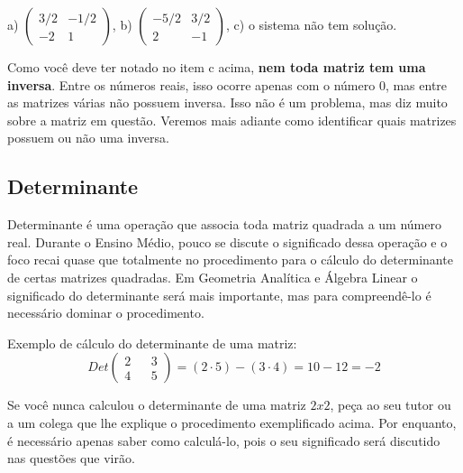 \documentclass[main.tex]{subfiles}
\begin{document}
\begin{gabarito}
	\begin{gabaritoQuestao}
		a) $\begin{pmatrix} 3/2 & -1/2 \\ -2 & 1\end{pmatrix}$, b) $\begin{pmatrix} -5/2 & 3/2 \\ 2 & -1\end{pmatrix}$, c) o sistema não tem solução.
	\end{gabaritoQuestao}
\end{gabarito}

Como você deve ter notado no item c acima, \textbf{nem toda matriz tem uma inversa}. Entre os números reais, isso ocorre apenas com o número 0, mas entre as matrizes várias não possuem inversa. Isso não é um problema, mas diz muito sobre a matriz em questão. Veremos mais adiante como identificar quais matrizes possuem ou não uma inversa.

\subsection*{Determinante}

Determinante é uma operação que associa toda matriz quadrada a um número real. Durante o Ensino Médio, pouco se discute o significado dessa operação e o foco recai quase que totalmente no procedimento para o cálculo do determinante de certas matrizes quadradas. Em Geometria Analítica e Álgebra Linear o significado do determinante será mais importante, mas para compreendê-lo é necessário dominar o procedimento.

\begin{caixaExemplo}
	Exemplo de cálculo do determinante de uma matriz:
	$$ Det \begin{pmatrix} 2 && 3 \\ 4 && 5 \end{pmatrix} = (2 \cdot 5) - (3 \cdot 4) = 10-12=-2$$
\end{caixaExemplo}

Se você nunca calculou o determinante de uma matriz $2x2$, peça ao seu tutor ou a um colega que lhe explique o procedimento exemplificado acima. Por enquanto, é necessário apenas saber como calculá-lo, pois o seu significado será discutido nas questões que virão.
\end{document}

